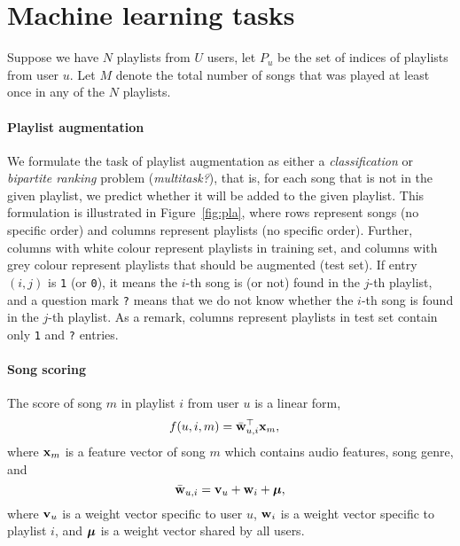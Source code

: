 \section{Machine learning tasks}

Suppose we have $N$ playlists from $U$ users, let $P_u$ be the set of indices of playlists from user $u$.
Let $M$ denote the total number of songs that was played at least once in any of the $N$ playlists.


\paragraph{Playlist augmentation}

We formulate the task of playlist augmentation as either a \emph{classification} or \emph{bipartite ranking} problem ({\it multitask?}),
that is, for each song that is not in the given playlist, 
we predict whether it will be added to the given playlist.
This formulation is illustrated in Figure~\ref{fig:pla},
where rows represent songs (no specific order) and columns represent playlists (no specific order).
Further, columns with white colour represent playlists in training set, 
and columns with grey colour represent playlists that should be augmented (\ie test set).
If entry $(i, j)$ is \texttt{1} (or \texttt{0}), 
it means the $i$-th song is (or not) found in the $j$-th playlist, 
and a question mark \texttt{?} means that we do not know whether the $i$-th song is found in the $j$-th playlist.
As a remark, columns represent playlists in test set contain only \texttt{1} and \texttt{?} entries.





\paragraph{Song scoring}

The score of song $m$ in playlist $i$ from user $u$ is a linear form,
\begin{equation*}
\begin{aligned}
f(u, i, m) &= \bar{\mathbf{w}}_{u,i}^\top \mathbf{x}_m,
\end{aligned}
\end{equation*}
where $\mathbf{x}_m$ is a feature vector of song $m$ which contains audio features, song genre, and 
\begin{equation*}
\bar{\mathbf{w}}_{u,i} = \mathbf{v}_u + \mathbf{w}_i + \bm{\mu},
\end{equation*}
where $\mathbf{v}_u$ is a weight vector specific to user $u$,
$\mathbf{w}_i$ is a weight vector specific to playlist $i$,
and $\bm{\mu}$ is a weight vector shared by all users.

